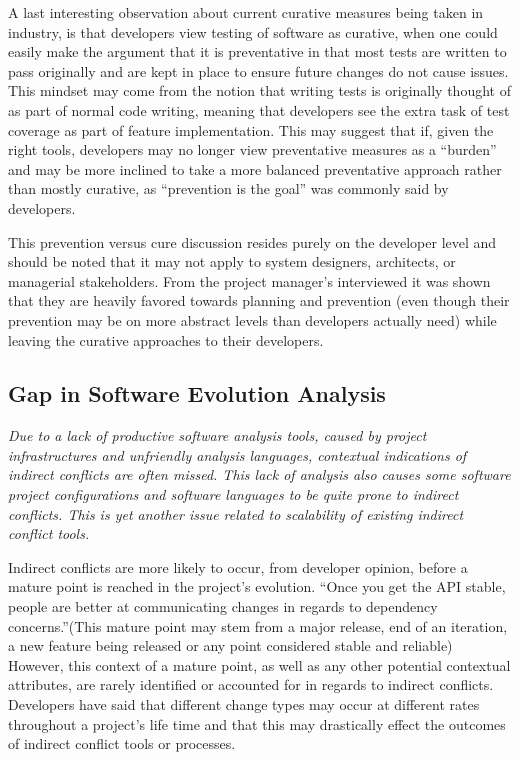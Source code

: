 \documentclass[conference]{IEEEtran}
\begin{document}
A last interesting observation about current curative measures being taken in industry, is that developers view testing of software
as curative, when one could easily make the argument that it is preventative in that most tests are written to pass originally and
are kept in place to ensure future changes do not cause issues. This mindset may come from the notion that writing tests is originally
thought of as part of normal code writing, meaning that developers see the extra task of test coverage as part of feature implementation.
This may suggest that if, given the right tools, developers may no longer view preventative
measures as a ``burden'' and may be more inclined to take a more balanced preventative approach rather than mostly curative, as
``prevention is the goal'' was commonly said by developers.

This prevention versus cure discussion resides purely on the developer level and should be noted that it may not apply to system
designers, architects, or managerial stakeholders.
From the project manager's interviewed it was shown that they are heavily favored towards planning and
prevention (even though their prevention may be on more abstract levels than developers actually need) while leaving the curative
approaches to their developers.

\subsection{Gap in Software Evolution Analysis}

\textit{Due to a lack of productive software analysis tools, caused by project infrastructures
and unfriendly analysis languages, contextual indications of indirect conflicts are often missed. This lack of analysis also causes
some software project configurations and software languages to be quite prone to indirect conflicts. This is yet another issue related
to scalability of existing indirect conflict tools.}

Indirect conflicts are more likely to occur,
from developer opinion, before a mature point is reached in the project's evolution. ``Once you get the API stable, people are
better at communicating changes in regards to dependency concerns.''(This mature point may stem from a major release,
end of an iteration, a new feature being released or any point considered stable and reliable) However, this context of a
mature point, as well as any other
potential contextual attributes, are rarely identified or accounted for in regards to indirect conflicts. Developers have said
that different change types may occur at different rates throughout a project's life time and that this
may drastically effect the outcomes of indirect conflict tools or processes.
\end{document}
